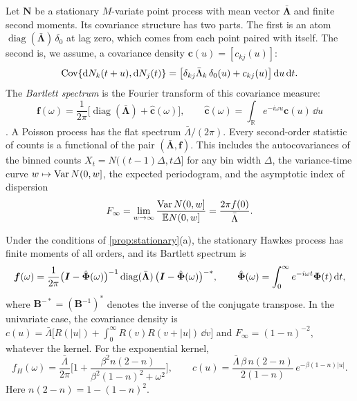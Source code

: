 Let $\bm N$ be a stationary $M$-variate point process with mean vector
$\bar{\bm\Lambda}$ and finite second moments. Its covariance structure has two parts.
The first is an atom $\operatorname{diag}(\bar{\bm\Lambda})\,\delta_0$ at lag zero,
which comes from each point paired with itself. The second is, we assume, a covariance
density $\bm c(u)=[c_{kj}(u)]$:
\[
\operatorname{Cov}\{\mathrm{d}N_k(t+u),\mathrm{d}N_j(t)\}=\big[\delta_{kj}\bar\Lambda_k\,\delta_0(u)+c_{kj}(u)\big]\,\mathrm{d} u\,\mathrm{d} t .
\]
The \emph{Bartlett spectrum} \citep{bartlett1963} is the Fourier transform of this
covariance measure:
\begin{equation}\label{eq:th-bartlett-def}
\bm f(\omega)=\frac1{2\pi}\Big[\operatorname{diag}(\bar{\bm\Lambda})+\hat{\bm c}(\omega)\Big],
\qquad \hat{\bm c}(\omega)=\int_{\mathbb R}e^{-i\omega u}\bm c(u)\,\dd u
\end{equation}
\citep[Ch.~8]{daley2003}. A Poisson process has the flat spectrum
$\bar\Lambda/(2\pi)$. Every second-order statistic of counts is a functional of the
pair $(\bar{\bm\Lambda},\bm f)$. This includes the autocovariances of the binned
counts $X_t=N((t-1)\Delta,t\Delta]$ for any bin width $\Delta$, the variance-time curve
$w\mapsto\operatorname{Var} N(0,w]$, the expected periodogram, and the asymptotic index of
dispersion
\[
F_\infty=\lim_{w\to\infty}\frac{\operatorname{Var} N(0,w]}{\mathbb{E} N(0,w]}=\frac{2\pi f(0)}{\bar\Lambda}.
\]

\begin{proposition}\label{prop:th-spectrum}
Under the conditions of \cref{prop:stationary}(a), the stationary Hawkes process has
finite moments of all orders, and its Bartlett spectrum is
\begin{equation}\label{eq:th-bartlett}
  \bm f(\omega)=\frac1{2\pi}\big(\bm{I}-\hat{\bm{\Phi}}(\omega)\big)^{-1}
  \operatorname{diag}(\bar{\bm\Lambda})\,\big(\bm{I}-\hat{\bm{\Phi}}(\omega)\big)^{-*},
  \qquad \hat{\bm{\Phi}}(\omega)=\int_0^\infty e^{-i\omega t}\bm{\Phi}(t)\,\mathrm{d} t ,
\end{equation}
where $\bm B^{-*}=(\bm B^{-1})^{*}$ denotes the inverse of the conjugate transpose. In
the univariate case, the covariance density is
$c(u)=\bar\Lambda\big[R(|u|)+\int_0^\infty R(v)R(v+|u|)\,\dd v\big]$ and
$F_\infty=(1-n)^{-2}$, whatever the kernel. For the exponential kernel,
\begin{equation}\label{eq:th-fH}
  f_H(\omega)=\frac{\bar\Lambda}{2\pi}\Big[1+\frac{\beta^2n(2-n)}{\beta^2(1-n)^2+\omega^2}\Big],
  \qquad
  c(u)=\frac{\bar\Lambda\,\beta\,n(2-n)}{2(1-n)}\,e^{-\beta(1-n)|u|}.
\end{equation}
Here $n(2-n)=1-(1-n)^2$.
\end{proposition}

